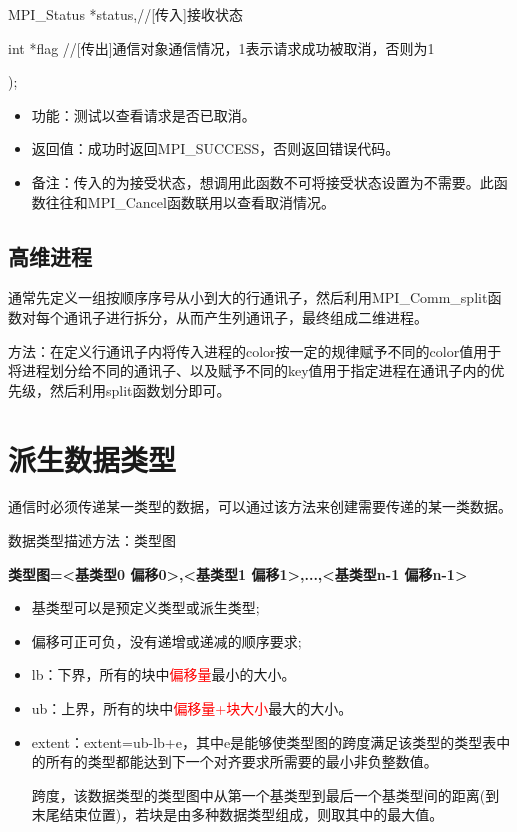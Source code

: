 \documentclass[UTF8]{article}%
\begin{document}
    \qquad MPI\_Status *status,//[传入]接收状态

    \qquad int         *flag //[传出]通信对象通信情况，1表示请求成功被取消，否则为1

);

\begin{itemize}
    \item 功能：测试以查看请求是否已取消。
    \item 返回值：成功时返回MPI\_SUCCESS，否则返回错误代码。
    \item 备注：传入的为接受状态，想调用此函数不可将接受状态设置为不需要。此函数往往和MPI\_Cancel函数联用以查看取消情况。
\end{itemize}

\subsection{高维进程}

通常先定义一组按顺序序号从小到大的行通讯子，然后利用MPI\_Comm\_split函数对每个通讯子进行拆分，从而产生列通讯子，最终组成二维进程。

方法：在定义行通讯子内将传入进程的color按一定的规律赋予不同的color值用于将进程划分给不同的通讯子、以及赋予不同的key值用于指定进程在通讯子内的优先级，然后利用split函数划分即可。

\section{派生数据类型}

通信时必须传递某一类型的数据，可以通过该方法来创建需要传递的某一类数据。

数据类型描述方法：类型图 

\textbf{类型图={<基类型0 偏移0>,<基类型1 偏移1>,...,<基类型n-1 偏移n-1>} }

\begin{itemize}
    \item 基类型可以是预定义类型或派生类型;
    \item 偏移可正可负，没有递增或递减的顺序要求;
    \item lb：下界，所有的块中\textcolor{red}{偏移量}最小的大小。
    \item ub：上界，所有的块中\textcolor{red}{偏移量+块大小}最大的大小。
    \item extent：extent=ub-lb+e，其中e是能够使类型图的跨度满足该类型的类型表中的所有的类型都能达到下一个对齐要求所需要的最小非负整数值。
    
    跨度，该数据类型的类型图中从第一个基类型到最后一个基类型间的距离(到末尾结束位置)，若块是由多种数据类型组成，则取其中的最大值。

\end{itemize}
\end{document}
